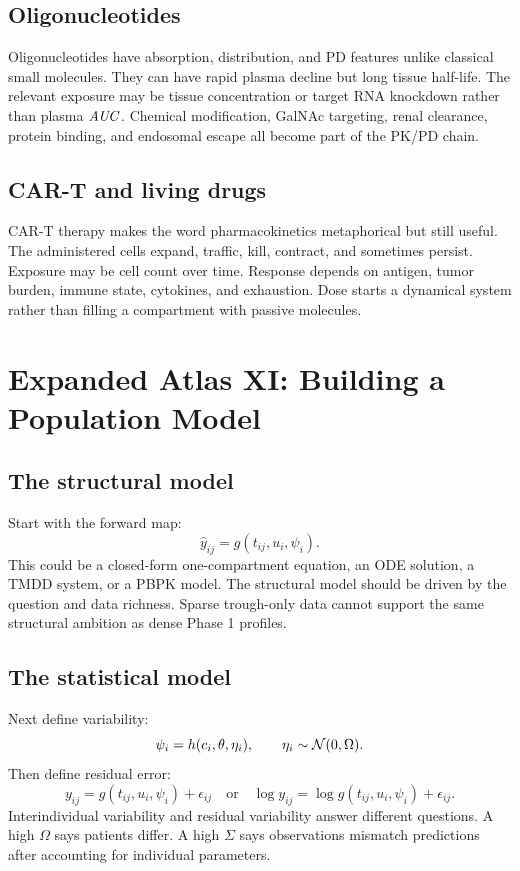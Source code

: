 \subsection{Oligonucleotides}

Oligonucleotides have absorption, distribution, and PD features unlike classical small molecules. They can have rapid plasma decline but long tissue half-life. The relevant exposure may be tissue concentration or target RNA knockdown rather than plasma \(\pkAUC\). Chemical modification, GalNAc targeting, renal clearance, protein binding, and endosomal escape all become part of the PK/PD chain.

\subsection{CAR-T and living drugs}

CAR-T therapy makes the word pharmacokinetics metaphorical but still useful. The administered cells expand, traffic, kill, contract, and sometimes persist. Exposure may be cell count over time. Response depends on antigen, tumor burden, immune state, cytokines, and exhaustion. Dose starts a dynamical system rather than filling a compartment with passive molecules.

\section{Expanded Atlas XI: Building a Population Model}

\subsection{The structural model}

Start with the forward map:
\[
  \hat y_{ij}=g(t_{ij},u_i,\psi_i).
\]
This could be a closed-form one-compartment equation, an ODE solution, a TMDD system, or a PBPK model. The structural model should be driven by the question and data richness. Sparse trough-only data cannot support the same structural ambition as dense Phase 1 profiles.

\subsection{The statistical model}

Next define variability:
\[
  \psi_i=h(c_i,\theta,\eta_i),
  \qquad
  \eta_i\sim\mathcal{N}(0,\Omega).
\]
Then define residual error:
\[
  y_{ij}=g(t_{ij},u_i,\psi_i)+\epsilon_{ij}
  \quad \text{or}\quad
  \log y_{ij}=\log g(t_{ij},u_i,\psi_i)+\epsilon_{ij}.
\]
Interindividual variability and residual variability answer different questions. A high \(\Omega\) says patients differ. A high \(\Sigma\) says observations mismatch predictions after accounting for individual parameters.

